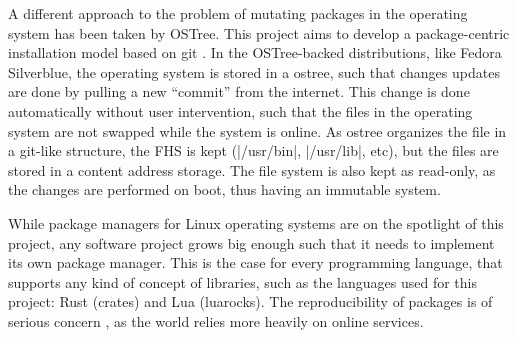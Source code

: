 A different approach to the problem of mutating packages in
the operating system has been taken by OSTree. This project
aims to develop a package-centric installation model based
on git \cite{waltersFutureContinuousIntegration2013} . In
the OSTree-backed distributions, like Fedora Silverblue, the
operating system is stored in a ostree, such that changes
updates are done by pulling a new ``commit'' from the
internet. This change is done automatically without user
intervention, such that the files in the operating system
are not swapped while the system is online. As ostree
organizes the file in a git-like structure, the \ac{FHS} is
kept (|/usr/bin|, |/usr/lib|, etc), but the files are stored
in a content address storage. The file system is also kept
as read-only, as the changes are performed on boot, thus
having an immutable system.

While package managers for Linux operating systems are on
the spotlight of this project, any software project grows
big enough such that it needs to implement its own package
manager. This is the case for every programming language,
that supports any kind of concept of libraries, such as the
languages used for this project: Rust (crates) and Lua
(luarocks). The reproducibility of packages is of serious
concern \cite{goswamiInvestigatingReproducibilityNPM2020}, as the world relies more heavily on online
services.
